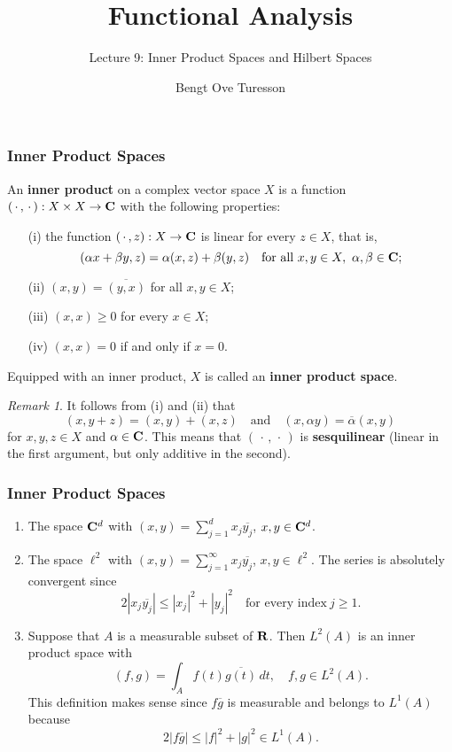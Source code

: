 \documentclass[handout]{beamer}
\title{Functional Analysis}
\subtitle{Lecture 9: Inner Product Spaces and Hilbert Spaces}
\author{Bengt Ove Turesson}
\makeatletter
\theoremstyle{remark}
\newtheorem{remark}[theorem]{Remark}
\newcommand{\R}{{\bf R}}
\newcommand{\C}{{\bf C}}
\newcommand{\enumabc}
	{\expandafter\def\csname the\@enumctr \endcsname{\alph{\@enumctr}}%
	 \expandafter\def\csname label\@enumctr \endcsname
		{\rm(\csname the\@enumctr \endcsname)}}%
\makeatother
\begin{document}
\begin{frame}
\titlepage
\end{frame}

\begin{frame}[shrink=15]\frametitle{Inner Product Spaces}

\begin{definition}
An {\bf inner product} on a complex vector space $X$ is a function
$(\,\cdot\,,\,\cdot\,):X\times X\rightarrow\C$ with the following properties:
\begin{itemize}
\item[(i)] the function $(\,\cdot\,,z):X\rightarrow\C$ is linear for every $z\in X$, that is,
$$(\alpha x+\beta y,z)=\alpha(x,z)+\beta(y,z)\quad\mbox{for all}\ x,y\in X,\ \alpha,\beta\in\C;$$
\item[(ii)] $(x,y)=\overline{(y,x)}$ for all $x,y\in X$;
\item[(iii)] $(x,x)\ge0$ for every $x\in X$;
\item[(iv)] $(x,x)=0$ if and only if $x=0$.
\end{itemize}
Equipped with an inner product, $X$ is called an {\bf inner product space}.
\end{definition}

\begin{remark}
It follows from (i) and (ii) that
$$(x,y+z)=(x,y)+(x,z)\quad\mbox{and}\quad (x,\alpha y)=\overline{\alpha}(x,y)$$
for $x,y,z\in X$ and $\alpha\in\C$. This means that $(\,\cdot\,,\,\cdot\,)$ is {\bf sesquilinear}
(linear in the first argument, but only additive in the second).
\end{remark}

\end{frame}

\begin{frame}[shrink=10]\frametitle{Inner Product Spaces}

\begin{example}
\begin{enumerate}\enumabc
\item The space $\C^d$ with $(x,y)=\sum^d_{j=1}x_j\overline{y_j}$, $x,y\in\C^d$.
\item The space $\ell^2$ with $(x,y)=\sum^\infty_{j=1}x_j\overline{y_j}$, $x,y\in\ell^2$.
The series is absolutely convergent since
$$2|x_j\overline{y_j}|\le|x_j|^2+|y_j|^2\quad\mbox{for every index}\ j\ge1.$$
\item Suppose that $A$ is a measurable subset of $\R$.
Then $L^2(A)$ is an inner product space with
$$(f,g)=\int_Af(t)\overline{g(t)}\,dt,\quad f,g\in L^2(A).$$
This definition makes sense since $f\overline{g}$ is measurable and belongs to $L^1(A)$ because
$$2|f\overline{g}|\le|f|^2+|g|^2\in L^1(A).$$
\end{enumerate}
\end{example}

\end{frame}
\end{document}

